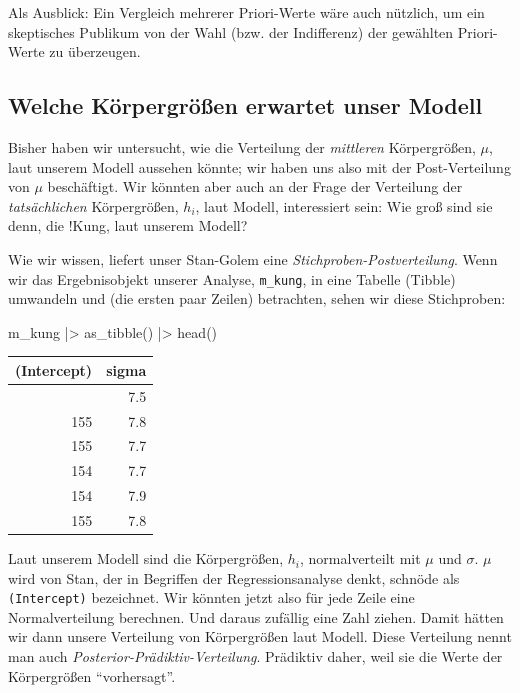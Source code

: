 \documentclass[
  ngerman,
  letterpaper,
  twoside,
  open=any]{scrbook}
\newenvironment{Shaded}{\begin{snugshade}}{\end{snugshade}}
\newcommand{\FunctionTok}[1]{\textcolor[rgb]{0.28,0.35,0.67}{#1}}
\newcommand{\NormalTok}[1]{\textcolor[rgb]{0.00,0.23,0.31}{#1}}
\newcommand{\SpecialCharTok}[1]{\textcolor[rgb]{0.37,0.37,0.37}{#1}}
\newcounter{none} %
\theoremstyle{definition}
\theoremstyle{plain}
\theoremstyle{definition}
\theoremstyle{definition}
\theoremstyle{definition}
\theoremstyle{definition}
\theoremstyle{remark}
\begin{document}
Als Ausblick: Ein Vergleich mehrerer Priori-Werte wäre auch nützlich, um
ein skeptisches Publikum von der Wahl (bzw. der Indifferenz) der
gewählten Priori-Werte zu überzeugen.

\subsection{Welche Körpergrößen erwartet unser
Modell}\label{welche-kuxf6rpergruxf6uxdfen-erwartet-unser-modell}

Bisher haben wir untersucht, wie die Verteilung der \emph{mittleren}
Körpergrößen, \(\mu\), laut unserem Modell aussehen könnte; wir haben
uns also mit der Post-Verteilung von \(\mu\) beschäftigt. Wir könnten
aber auch an der Frage der Verteilung der \emph{tatsächlichen}
Körpergrößen, \(h_i\), laut Modell, interessiert sein: Wie groß sind sie
denn, die !Kung, laut unserem Modell?

Wie wir wissen, liefert unser Stan-Golem eine
\emph{Stichproben-Postverteilung}. Wenn wir das Ergebnisobjekt unserer
Analyse, \texttt{m\_kung}, in eine Tabelle (Tibble) umwandeln und (die
ersten paar Zeilen) betrachten, sehen wir diese Stichproben:

\begin{Shaded}
\begin{Highlighting}[]
\NormalTok{m\_kung }\SpecialCharTok{|\textgreater{}} \FunctionTok{as\_tibble}\NormalTok{() }\SpecialCharTok{|\textgreater{}} \FunctionTok{head}\NormalTok{()}
\end{Highlighting}
\end{Shaded}

{\def\LTcaptype{none} %
\begin{longtable}[]{@{}rr@{}}
\toprule\noalign{}
(Intercept) & sigma \\
\midrule\noalign{}
\endhead
\bottomrule\noalign{}
\endlastfoot
154 & 7.5 \\
155 & 7.8 \\
155 & 7.7 \\
154 & 7.7 \\
154 & 7.9 \\
155 & 7.8 \\
\end{longtable}
}

Laut unserem Modell sind die Körpergrößen, \(h_i\), normalverteilt mit
\(\mu\) und \(\sigma\). \(\mu\) wird von Stan, der in Begriffen der
Regressionsanalyse denkt, schnöde als \texttt{(Intercept)} bezeichnet.
Wir könnten jetzt also für jede Zeile eine Normalverteilung berechnen.
Und daraus zufällig eine Zahl ziehen. Damit hätten wir dann unsere
Verteilung von Körpergrößen laut Modell. Diese Verteilung nennt man auch
\emph{Posterior-Prädiktiv-Verteilung}. Prädiktiv daher, weil sie die
Werte der Körpergrößen \enquote{vorhersagt}.
\end{document}
